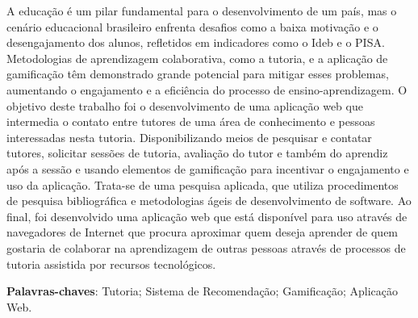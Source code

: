 \begin{resumo}

A educação é um pilar fundamental para o desenvolvimento de um país, mas o cenário educacional brasileiro enfrenta desafios como a baixa motivação e o desengajamento dos alunos, refletidos em indicadores como o Ideb e o PISA. Metodologias de aprendizagem colaborativa, como a tutoria, e a aplicação de gamificação têm demonstrado grande potencial para mitigar esses problemas, aumentando o engajamento e a eficiência do processo de ensino-aprendizagem. O objetivo deste trabalho foi o desenvolvimento de uma aplicação web que intermedia o contato entre tutores de uma área de conhecimento e pessoas interessadas nesta tutoria. Disponibilizando meios de pesquisar e contatar tutores, solicitar sessões de tutoria, avaliação do tutor e também do aprendiz após a sessão e usando elementos de gamificação para incentivar o engajamento e uso da aplicação. Trata-se de uma pesquisa aplicada, que utiliza procedimentos de pesquisa bibliográfica e metodologias ágeis de desenvolvimento de software. Ao final, foi desenvolvido uma aplicação web que está disponível para uso através de navegadores de Internet que procura aproximar quem deseja aprender de quem gostaria de colaborar na aprendizagem de outras pessoas através de processos de tutoria assistida por recursos tecnológicos.

 \vspace{\onelineskip}
    
 \noindent
 \textbf{Palavras-chaves}: Tutoria; Sistema de Recomendação; Gamificação; Aplicação Web.
\end{resumo}
